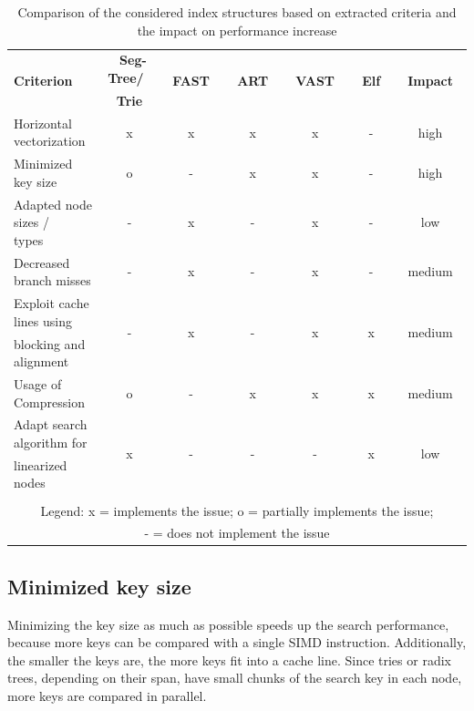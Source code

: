 \documentclass[runningheads,a4paper]{llncs}
\begin{document}
\begin{table}[htbp]
\footnotesize
	\begin{center}
		\begin{tabular}{l|c|c|c|c|c|c}
			\hline
			\multirow{2}{*}{\textbf{Criterion}}&\textbf{~Seg-Tree/~}&\multirow{2}{*}{\textbf{~FAST~}}&\multirow{2}{*}{\textbf{~ART~}}&\multirow{2}{*}{\textbf{~VAST~}}&\multirow{2}{*}{\textbf{~Elf~}}&\multirow{2}{*}{\textbf{~Impact~}}\\
			&\textbf{Trie}&&&&&\\
			\hline
			Horizontal vectorization & x & x & x & x & - &high\\[.1cm]
			Minimized key size & o & - & x & x & - &high\\[.1cm]
			Adapted node sizes / types~~& - & x & - & x & - &low\\[.1cm]
			Decreased branch misses & - & x & - & x & - &medium\\[.1cm]
			Exploit cache lines using& \multirow{2}{*}{-} &  \multirow{2}{*}{x} &  \multirow{2}{*}{-} &  \multirow{2}{*}{x} &  \multirow{2}{*}{x}  &\multirow{2}{*}{medium}\\
			 blocking and alignment &&&&&&\\[.1cm]
			Usage of Compression & o & - & x & x & x &medium\\[.1cm]
			Adapt search algorithm for &  \multirow{2}{*}{x}  &  \multirow{2}{*}{-} &  \multirow{2}{*}{-}  &  \multirow{2}{*}{-}  & \multirow{2}{*}{x}  &  \multirow{2}{*}{low} \\
			 linearized nodes &&&&&&\\
			 \multicolumn{7}{c}{}\\
			\hline
			\multicolumn{7}{|c|}{Legend: x = implements the issue; o = partially implements the issue;}\\
			\multicolumn{7}{|c|}{ - = does not implement the issue}\\
			\hline
		\end{tabular}
	\caption{Comparison of the considered index structures based on extracted criteria and the impact on performance increase}
		\label{tasuaib2011architecture}
	\end{center}
\end{table}%

\subsection{Minimized key size}
Minimizing the key size as much as possible speeds up the search performance, because more keys can be compared with a single SIMD instruction. Additionally, the smaller the keys are, the more keys fit into a cache line. Since tries or radix trees, depending on their span, have small chunks of the search key in each node, more keys are compared in parallel.
\end{document}
